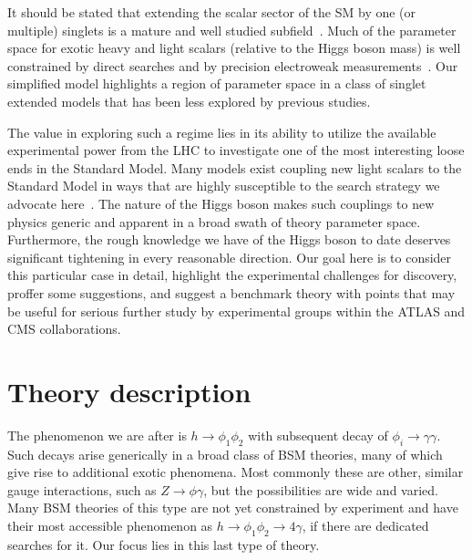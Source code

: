 \documentclass[letter,12pt]{article}
\begin{document}
It should be stated that extending the scalar sector of the SM by one (or multiple) singlets is a mature and well studied subfield~\cite{Robens:2015gla,Barger:2007im,Robens:2019kga}. Much of the parameter space for exotic heavy and light  scalars (relative to the Higgs boson mass) is well constrained by direct searches and by precision electroweak measurements~\cite{Lopez-Val:2014jva}. Our simplified model highlights a region of parameter space in a class of singlet extended models that has been less explored by previous studies.

The value in exploring such a regime lies in its ability to utilize the available experimental power from the LHC to investigate one of the most interesting loose ends in the Standard Model. Many models exist coupling new light scalars to the Standard Model in ways that are highly susceptible to the search strategy we advocate here~\cite{Csaki:2020zqz}. The nature of the Higgs boson makes such couplings to new physics generic and apparent in a broad swath of theory parameter space. Furthermore, the rough knowledge we have of the Higgs boson to date deserves significant tightening in every reasonable direction. Our goal here is to consider this particular case in detail, highlight the experimental challenges for discovery, proffer some suggestions, and suggest a benchmark theory with points that may be useful for serious further study by experimental groups within the ATLAS and CMS collaborations.

\section{Theory description}

The phenomenon we are after is $h\to\phi_1\phi_2$ with subsequent decay of $\phi_i\to\gamma\gamma$. Such decays arise generically in a broad class of BSM theories, many of which give rise to additional exotic phenomena. Most commonly these are other, similar gauge interactions, such as $Z\to\phi\gamma$, but the possibilities are wide and varied. Many BSM theories of this type are not yet constrained by experiment and have their most accessible phenomenon as $h\to\phi_1\phi_2\to 4\gamma$, if there are dedicated searches for it. Our focus lies in this last type of theory.
\end{document}
